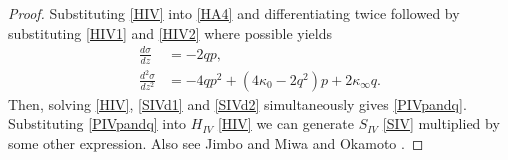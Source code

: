 \documentclass[12pt]{article}
\numberwithin{figure}{section}
\numberwithin{equation}{section}
\numberwithin{table}{section}
\begin{document}
\begin{proof}
Substituting \eqref{HIV} into \eqref{HA4} and differentiating twice followed by substituting \eqref{HIV1} and \eqref{HIV2} where possible yields
\begin{subequations}
\begin{align}
\frac{d\sigma}{dz}&=-2qp,\label{SIVd1}\\
\frac{d^2\sigma}{dz^2}&=-4qp^2+(4\kappa_0-2q^2)p+2\kappa_\infty q.\label{SIVd2}
\end{align}
\end{subequations}
Then, solving \eqref{HIV}, \eqref{SIVd1} and \eqref{SIVd2} simultaneously gives \eqref{PIVpandq}.
Substituting \eqref{PIVpandq} into $H_{IV}$ \eqref{HIV} we can generate $S_{IV}$ \eqref{SIV} multiplied by some other expression.
Also see Jimbo and Miwa \cite{P:2:407} and Okamoto \cite{P:275:221}.
\end{proof}
\end{document}
